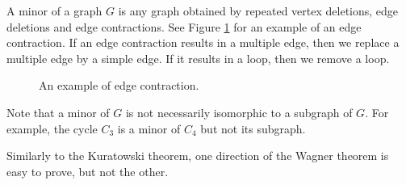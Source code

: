 

\setcounter{section}{3}
\setcounter{subsection}{4}
\setcounter{dfn}{11}


A minor of a graph $G$ is any graph obtained by repeated vertex deletions, edge deletions and edge contractions.
See Figure \ref{fig:K5Contraction} for an example of an edge contraction.
If an edge contraction results in a multiple edge, then we replace a multiple edge by a simple edge.
If it results in a loop, then we remove a loop.

\begin{figure}[ht]
\begin{center}

\end{center}
\caption{An example of edge contraction.}
\label{fig:K5Contraction}
\end{figure}

Note that a minor of $G$ is not necessarily isomorphic to a subgraph of $G$.
For example, the cycle $C_3$ is a minor of $C_4$ but not its subgraph.

Similarly to the Kuratowski theorem, one direction of the Wagner theorem is easy to prove, but not the other.




